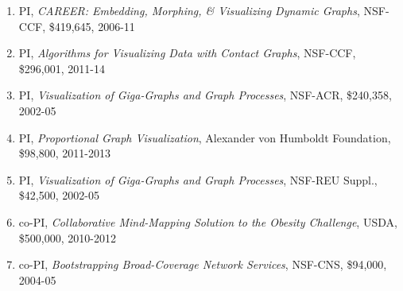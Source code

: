 \documentclass[10pt]{article}
\begin{document}
\begin{description}
\begin{enumerate}
\item PI, {\em CAREER: Embedding, Morphing, \& Visualizing Dynamic
    Graphs}, NSF-CCF, \$419,645, 2006-11

\item PI, {\em Algorithms for Visualizing Data with Contact Graphs},
  NSF-CCF, \$296,001, 2011-14

\item PI, {\em Visualization of Giga-Graphs and Graph Processes},
  NSF-ACR, \$240,358, 2002-05

\item PI, {\em Proportional Graph Visualization}, Alexander von Humboldt
  Foundation, \$98,800, 2011-2013





\item PI, {\em Visualization of Giga-Graphs and Graph Processes}, NSF-REU Suppl., \$42,500, 2002-05



\item co-PI, {\em Collaborative Mind-Mapping Solution to the Obesity Challenge}, USDA, \$500,000, 2010-2012

\item co-PI, {\em Bootstrapping Broad-Coverage Network Services}, NSF-CNS, \$94,000, 2004-05 



%


\end{enumerate}
\end{description}
\end{document}
